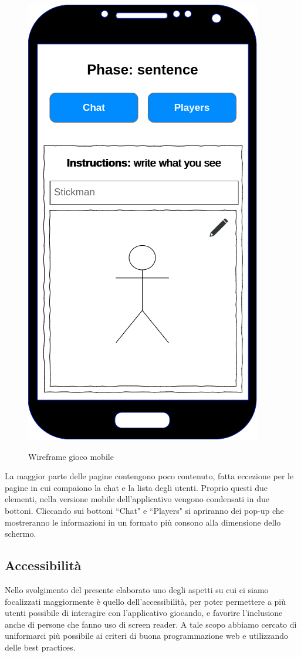 \begin{figure}[H]
    \caption{Wireframe gioco mobile}
    \centering
    \includegraphics[width=.5\linewidth]{img/wireframes/mobile_in_game.png}
    \label{fig:wireframe_in_game_mobile}
\end{figure}

\noindent La maggior parte delle pagine contengono poco contenuto, fatta eccezione per le pagine in cui compaiono la chat e la lista degli utenti.\newline
Proprio questi due elementi, nella versione mobile dell'applicativo vengono condensati in due bottoni. Cliccando sui bottoni ``Chat" e ``Players" si apriranno dei pop-up che mostreranno le informazioni in un formato più consono alla dimensione dello schermo.

\subsection{Accessibilità}
Nello svolgimento del presente elaborato uno degli aspetti su cui ci siamo focalizzati maggiormente è quello dell'accessibilità, per poter permettere a più utenti possibile di interagire con l'applicativo giocando, e favorire l'inclusione anche di persone che fanno uso di screen reader. A tale scopo abbiamo cercato di uniformarci più possibile ai criteri di buona programmazione web e utilizzando delle best practices. \newline

